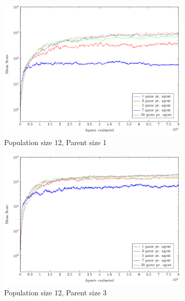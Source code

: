 \begin{figure}
	\centering
	\captionsetup[subfigure]{justification=centering}
    \begin{subfigure}[b]{0.49\textwidth}
    	\caption{Population size 12, Parent size 1}
        \includegraphics[width=\textwidth]{data/ce_population_offspring/12x_split/constant_l12_o1/mean/PlotFile.pdf}
    \end{subfigure} 
    \begin{subfigure}[b]{0.49\textwidth}
    	\caption{Population size 12, Parent size 3}
        \includegraphics[width=\textwidth]{data/ce_population_offspring/12x_split/constant_l12_o3/mean/PlotFile.pdf}
    \end{subfigure}
    \begin{subfigure}[b]{0.49\textwidth}

\end{subfigure}
\end{figure}
